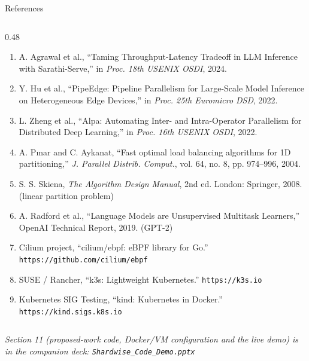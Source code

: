 \documentclass[aspectratio=169,9pt]{beamer}
\begin{document}
\begin{frame}[shrink=25]{References}
\begin{columns}[T]
\begin{column}{0.48\textwidth}
\begin{enumerate}
    \item A. Agrawal et al., ``Taming Throughput-Latency Tradeoff in LLM
      Inference with Sarathi-Serve,'' in \emph{Proc. 18th USENIX OSDI}, 2024.
    \item Y. Hu et al., ``PipeEdge: Pipeline Parallelism for Large-Scale Model
      Inference on Heterogeneous Edge Devices,'' in \emph{Proc. 25th Euromicro
      DSD}, 2022.
    \item L. Zheng et al., ``Alpa: Automating Inter- and Intra-Operator
      Parallelism for Distributed Deep Learning,'' in \emph{Proc. 16th USENIX
      OSDI}, 2022.
    \item A. P{\i}nar and C. Aykanat, ``Fast optimal load balancing algorithms
      for 1D partitioning,'' \emph{J. Parallel Distrib. Comput.}, vol. 64,
      no. 8, pp. 974--996, 2004.
    \item S. S. Skiena, \emph{The Algorithm Design Manual}, 2nd ed. London:
      Springer, 2008. (linear partition problem)
    \item A. Radford et al., ``Language Models are Unsupervised Multitask
      Learners,'' OpenAI Technical Report, 2019. (GPT-2)
    \item Cilium project, ``cilium/ebpf: eBPF library for Go.''
      \texttt{https://github.com/cilium/ebpf}
    \item SUSE / Rancher, ``k3s: Lightweight Kubernetes.''
      \texttt{https://k3s.io}
    \item Kubernetes SIG Testing, ``kind: Kubernetes in Docker.''
      \texttt{https://kind.sigs.k8s.io}
  \end{enumerate}
    \end{column}
  \end{columns}
  \vspace{0.5em}
  {\scriptsize\color{keMuted}\itshape Section 11 (proposed-work code, Docker/VM
  configuration and the live demo) is in the companion deck:
  \texttt{Shardwise\_Code\_Demo.pptx}}
\end{frame}
\end{document}
